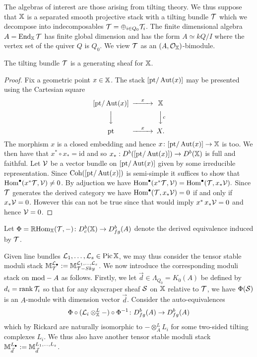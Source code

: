 \documentclass[12pt]{amsart}
\begin{document}
The algebras of interest are those arising from tilting theory. We thus suppose that $\mathbb{X}$ is a separated smooth projective stack with a tilting bundle $\mathcal{T}$ which we decompose into indecomposables $\mathcal{T} = \oplus_{i \in Q_0} \mathcal{T}_i$. The finite dimensional algebra $A = \operatorname{End}_{\mathbb{X}}{\mathcal{T}}$ has finite global dimension and has the form $A \simeq kQ/I$ where the vertex set of the quiver $Q$ is $Q_0$. We view $\mathcal{T}$ as an $(A,\mathcal{O}_{\mathbb{X}})$-bimodule. 
\begin{proposition}  \label{prop:Tgenerates}
The tilting bundle $\mathcal{T}$ is a generating sheaf for $\mathbb{X}$.
\end{proposition}
\begin{proof}
Fix a geometric point $x \in \mathbb{X}$. 
The stack $[\text{pt}/\operatorname{Aut}(x)]$ may be presented using the Cartesian square 
\begin{equation*}
\begin{CD}
[\text{pt}/\Aut(x)] @>x>> \bX\\
@VVV @VVcV\\
\text{pt} @>x>> X.
\end{CD}
\end{equation*} 
The morphism $x$ is a closed embedding and hence $x \colon [\text{pt}/\operatorname{Aut}(x)] \rightarrow \mathbb{X}$ is too. 
We then have that $x^* \circ x_* = \text{id}$ and so $x_*: D^b([\text{pt}/\operatorname{Aut}(x)]) \rightarrow D^b(\mathbb{X})$ is full and faithful. 
Let $\mathcal{V}$ be a vector bundle on $[\text{pt}/\operatorname{Aut}(x)]$ given by some irreducible representation. 
Since $\operatorname{Coh}([\text{pt}/\operatorname{Aut}(x)])$ is semi-simple it suffices to show that $\operatorname{Hom}^\bullet(x^* \mathcal{T}, \mathcal{V}) \neq 0$. 
By adjuction we have $\operatorname{Hom}^\bullet(x^* \mathcal{T}, \mathcal{V}) = \operatorname{Hom}^\bullet(\mathcal{T}, x_* \mathcal{V}).$ 
Since $\mathcal{T}$ generates the derived category we have $\operatorname{Hom}^\bullet(\mathcal{T}, x_* \mathcal{V})= 0$ if and only if $x_* \mathcal{V} = 0$. 
However this can not be true since that would imply $x^* \, x_* \mathcal{V} = 0$ and hence $\mathcal{V} =0$. 
\end{proof}
Let $\Phi = \mathop{\mathbb{R}\mathrm{Hom}}\nolimits_{\mathbb{X}}(\mathcal{T},-) \colon D^b_{c}(\mathbb{X}) \to D^b_{fg}(A)$ denote the derived equivalence induced by $\mathcal{T}$. 

Given line bundles $\mathcal{L}_1,\ldots, \mathcal{L}_s \in \operatorname{Pic} \mathbb{X}$, we may thus consider the tensor stable moduli stack $\mathbb{M}_{\mathcal{T}}^{\mathcal{L}_{\bullet}} := \mathbb{M}_{\mathcal{T}-Sky}^{\mathcal{L}_1,\ldots,\mathcal{L}_s}$. We now introduce the corresponding moduli stack on $\textup{mod}-A$ as follows. Firstly, we let $\vec{d}\in \Lambda_{Q_0} = K_0(A)$ be defined by $d_i = \operatorname{rank} \mathcal{T}_i$ so that for any skyscraper sheaf $\mathcal{S}$ on $\mathbb{X}$ relative to $\mathcal{T}$, we have $\Phi(\mathcal{S})$ is an $A$-module with dimension vector $\vec{d}$. Consider the auto-equivalences
$$ \Phi \circ (\mathcal{L}_i \otimes^L_{\mathbb{X}} -) \circ \Phi^{-1} \colon D^b_{fg}(A) \to D^b_{fg}(A)$$
which by Rickard \cite{MR1002456} are naturally isomorphic to $- \otimes^L_A L_i$ for some two-sided tilting complexes $L_i$. We thus also have another tensor stable moduli stack $\mathbb{M}_{\vec{d}}^{L_{\bullet}} := \mathbb{M}_{\vec{d}}^{L_1,\ldots,L_s}$. 
\end{document}
